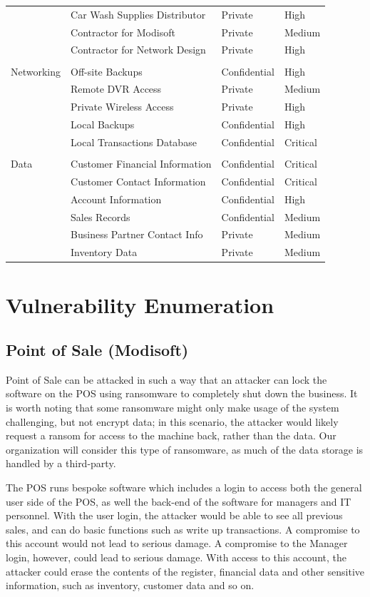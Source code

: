 \documentclass[11pt]{article}
\begin{document}
\begin{longtable}{llll}
 & Car Wash Supplies Distributor & Private & High\\[0pt]
 & Contractor for Modisoft & Private & Medium\\[0pt]
 & Contractor for Network Design & Private & High\\[0pt]
 &  &  & \\[0pt]
Networking & Off-site Backups & Confidential & High\\[0pt]
 & Remote DVR Access & Private & Medium\\[0pt]
 & Private Wireless Access & Private & High\\[0pt]
 & Local Backups & Confidential & High\\[0pt]
 & Local Transactions Database & Confidential & Critical\\[0pt]
 &  &  & \\[0pt]
Data & Customer Financial Information & Confidential & Critical\\[0pt]
 & Customer Contact Information & Confidential & Critical\\[0pt]
 & Account Information & Confidential & High\\[0pt]
 & Sales Records & Confidential & Medium\\[0pt]
 & Business Partner Contact Info & Private & Medium\\[0pt]
 & Inventory Data & Private & Medium\\[0pt]
\end{longtable}

\section{Vulnerability Enumeration}
\label{sec:org4308b78}
\subsection{Point of Sale (Modisoft)}
\label{sec:org14bc96e}
Point of Sale can be attacked in such a way that an attacker can lock the software on the POS using ransomware to completely shut down the business. It is worth noting that some ransomware might only make usage of the system challenging, but not encrypt data; in this scenario, the attacker would likely request a ransom for access to the machine back, rather than the data. Our organization will consider this type of ransomware, as much of the data storage is handled by a third-party.

The POS runs bespoke software which includes a login to access both the general user side of the POS, as well the back-end of the software for managers and IT personnel. With the user login, the attacker would be able to see all previous sales, and can do basic functions such as write up transactions. A compromise to this account would not lead to serious damage. A compromise to the Manager login, however, could lead to serious damage. With access to this account, the attacker could erase the contents of the register, financial data and other sensitive information, such as inventory, customer data and so on.
\end{document}
